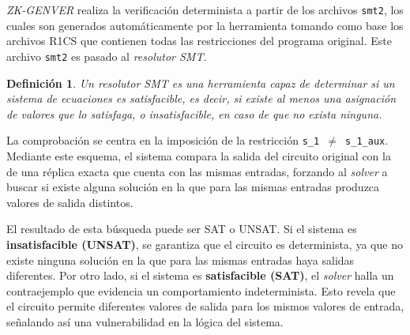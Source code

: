 \documentclass[a4paper,12pt]{report}
\newtheorem{definicion}{Definición}
\begin{document}
	\vspace{0.2cm}
	\noindent \textit{ZK-GENVER} realiza la verificación determinista a partir de los archivos \texttt{smt2}, los cuales son generados automáticamente por la herramienta tomando como base los archivos R1CS que contienen todas las restricciones del programa original. Este archivo \texttt{smt2} es pasado al \textit{resolutor SMT}.
	
	
	\vspace{0.2cm}
	\begin{definicion}
		Un resolutor SMT es una herramienta capaz de determinar si un sistema de ecuaciones es \textit{satisfacible}, es decir, si existe al menos una asignación de valores que lo satisfaga, o \textit{insatisfacible}, en caso de que no exista ninguna.
	\end{definicion}
	
	\vspace{0.2cm}
	\noindent La comprobación se centra en la imposición de la restricción \texttt{s\_1 $\neq$ s\_1\_aux}. Mediante este esquema, el sistema compara la salida del circuito original con la de una réplica exacta que cuenta con las mismas entradas, forzando al \textit{solver} a buscar si existe alguna solución en la que para las mismas entradas produzca valores de salida distintos.
	
	\vspace{0.2cm}
	\noindent El resultado de esta búsqueda puede ser SAT o UNSAT. Si el sistema es \textbf{insatisfacible (UNSAT)}, se garantiza que el circuito es determinista, ya que no existe ninguna solución en la que para las mismas entradas haya salidas diferentes. Por otro lado, si el sistema es \textbf{satisfacible (SAT)}, el \textit{solver} halla un contraejemplo que evidencia un comportamiento indeterminista. Esto revela que el circuito permite diferentes valores de salida para los mismos valores de entrada, señalando así una vulnerabilidad en la lógica del sistema.
	
\end{document}
